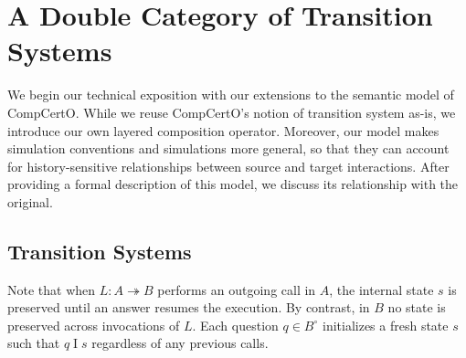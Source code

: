 \documentclass[acmsmall,screen,review,anonymous]{acmart}
\newcommand{\que}{\circ}
\begin{document}

\section{A Double Category of Transition Systems} \label{sec:base} %


We begin our technical exposition with
our extensions to the semantic model of CompCertO.
While we reuse CompCertO's notion of transition system as-is,
we introduce our own layered composition operator.
Moreover,
our model makes simulation conventions and simulations
more general, so that they can account for
history-sensitive relationships
between source and target interactions.
After providing a formal description of this model,
we discuss its relationship with the original.


\subsection{Transition Systems} \label{sec:base:ts} %


Note that
when $L : A \twoheadrightarrow B$
performs an outgoing call in $A$,
the internal state $s$ is preserved
until an answer resumes the execution.
By contrast, in $B$
no state is preserved across invocations of $L$.
Each question $q \in B^\que$ initializes a fresh state $s$
such that $q \mathrel{I} s$
regardless of any previous calls. %
\end{document}
